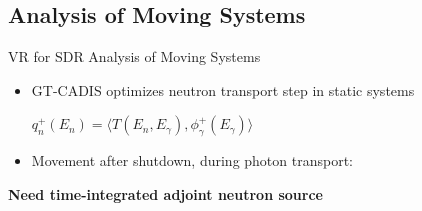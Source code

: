 \documentclass{beamer}
\begin{document}
\subsection{Analysis of Moving Systems}
\begin{frame}{VR for SDR Analysis of Moving Systems}
	\begin{itemize}
		\item{GT-CADIS optimizes neutron transport step in static
			systems}
			\begin{center}
	$q^{+}_n(E_n) = \langle T(E_n, E_{\gamma}) ,
	\phi_{\gamma}^{+}(E_{\gamma}) \rangle$
			\end{center}
			\vspace{0.5cm}
		\item{Movement after shutdown, during photon transport:}
	\end{itemize}
	\vspace{0.5cm}
	\centering
		{\textbf{Need time-integrated adjoint neutron source}}

\end{frame}
\end{document}
